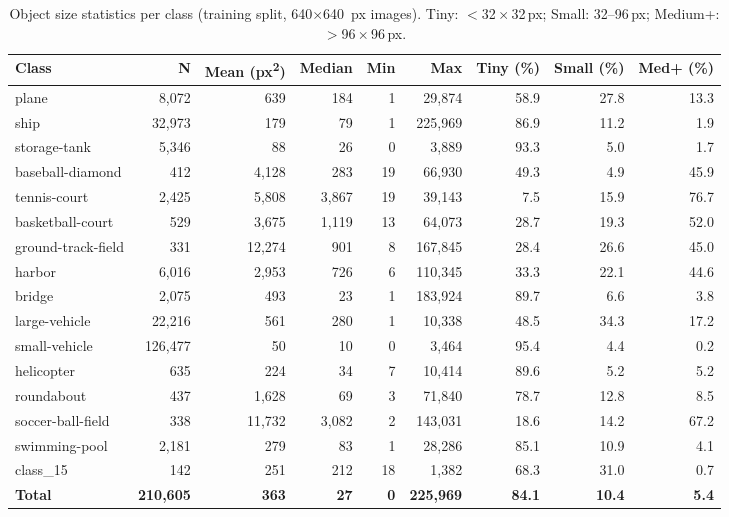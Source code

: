 \begin{table}[htbp]
\centering
\caption{Object size statistics per class (training split, 640$\times$640~px images). Tiny: $<$32\,$\times$\,32\,px; Small: 32--96\,px; Medium+: $>$96\,$\times$\,96\,px.}
\label{tab:dota15_yolo_temp_sizes}
\begin{tabular}{lrrrrrrrr}
\toprule
\textbf{Class} & \textbf{N} & \textbf{Mean (px\textsuperscript{2})} & \textbf{Median} & \textbf{Min} & \textbf{Max} & \textbf{Tiny (\%)} & \textbf{Small (\%)} & \textbf{Med+ (\%)} \\
\midrule
plane & 8,072 & 639 & 184 & 1 & 29,874 & 58.9 & 27.8 & 13.3 \\
ship & 32,973 & 179 & 79 & 1 & 225,969 & 86.9 & 11.2 & 1.9 \\
storage-tank & 5,346 & 88 & 26 & 0 & 3,889 & 93.3 & 5.0 & 1.7 \\
baseball-diamond & 412 & 4,128 & 283 & 19 & 66,930 & 49.3 & 4.9 & 45.9 \\
tennis-court & 2,425 & 5,808 & 3,867 & 19 & 39,143 & 7.5 & 15.9 & 76.7 \\
basketball-court & 529 & 3,675 & 1,119 & 13 & 64,073 & 28.7 & 19.3 & 52.0 \\
ground-track-field & 331 & 12,274 & 901 & 8 & 167,845 & 28.4 & 26.6 & 45.0 \\
harbor & 6,016 & 2,953 & 726 & 6 & 110,345 & 33.3 & 22.1 & 44.6 \\
bridge & 2,075 & 493 & 23 & 1 & 183,924 & 89.7 & 6.6 & 3.8 \\
large-vehicle & 22,216 & 561 & 280 & 1 & 10,338 & 48.5 & 34.3 & 17.2 \\
small-vehicle & 126,477 & 50 & 10 & 0 & 3,464 & 95.4 & 4.4 & 0.2 \\
helicopter & 635 & 224 & 34 & 7 & 10,414 & 89.6 & 5.2 & 5.2 \\
roundabout & 437 & 1,628 & 69 & 3 & 71,840 & 78.7 & 12.8 & 8.5 \\
soccer-ball-field & 338 & 11,732 & 3,082 & 2 & 143,031 & 18.6 & 14.2 & 67.2 \\
swimming-pool & 2,181 & 279 & 83 & 1 & 28,286 & 85.1 & 10.9 & 4.1 \\
class\_15 & 142 & 251 & 212 & 18 & 1,382 & 68.3 & 31.0 & 0.7 \\
\midrule
\textbf{Total} & \textbf{210,605} & \textbf{363} & \textbf{27} & \textbf{0} & \textbf{225,969} & \textbf{84.1} & \textbf{10.4} & \textbf{5.4} \\
\bottomrule
\end{tabular}
\end{table}
